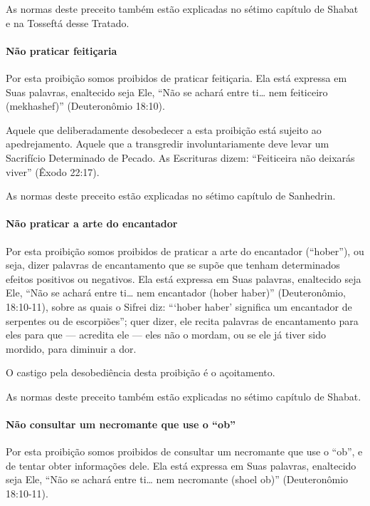 As normas deste preceito também estão explicadas no sétimo capítulo de
Shabat e na Tosseftá desse Tratado.

\paragraph{Não praticar feitiçaria}

Por esta proibição somos proibidos de praticar feitiçaria. Ela está
expressa em Suas palavras, enaltecido seja Ele, ``Não se achará entre
ti\ldots{} nem feiticeiro (mekhashef)'' (Deuteronômio 18:10).

Aquele que deliberadamente desobedecer a esta proibição está sujeito ao
apedrejamento. Aquele que a transgredir involuntariamente deve levar um
Sacrifício Determinado de Pecado. As Escrituras dizem: ``Feiticeira não
deixarás viver'' (Êxodo 22:17).

As normas deste preceito estão explicadas no sétimo capítulo de Sanhedrin.

\paragraph{Não praticar a arte do encantador}

Por esta proibição somos proibidos de praticar a arte do encantador
(``hober''), ou seja, dizer palavras de encantamento que se supõe que
tenham determinados efeitos positivos ou negativos. Ela está expressa em
Suas palavras, enaltecido seja Ele, ``Não se achará entre ti\ldots{} nem
encantador (hober haber)'' (Deuteronômio, 18:10-11), sobre as quais o
Sifrei diz: ```hober haber' significa um encantador de serpentes ou de
escorpiões''; quer dizer, ele recita palavras de encantamento para eles
para que --- acredita ele --- eles não o mordam, ou se ele já tiver sido
mordido, para diminuir a dor.

O castigo pela desobediência desta proibição é o açoitamento.

As normas deste preceito também estão explicadas no sétimo capítulo de
Shabat.

\paragraph{Não consultar um necromante que use o ``ob''}

Por esta proibição somos proibidos de consultar um necromante que use o
``ob'', e de tentar obter informações dele. Ela está expressa em Suas
palavras, enaltecido seja Ele, ``Não se achará entre ti\ldots{} nem
necromante (shoel ob)'' (Deuteronômio 18:10-11).

